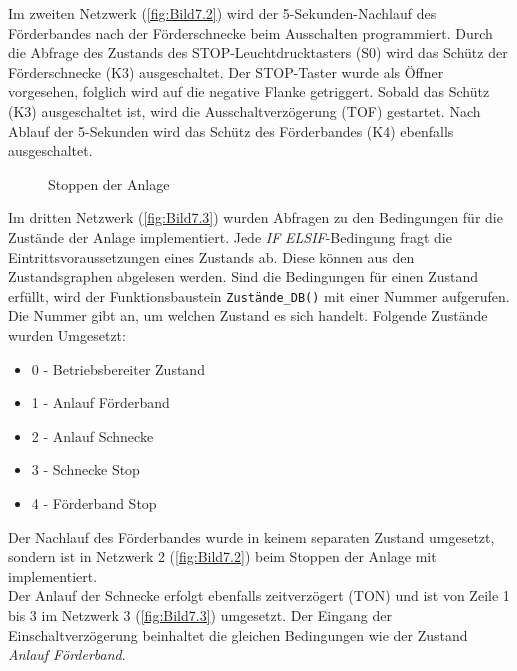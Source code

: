Im zweiten Netzwerk (\autoref{fig:Bild7.2}) wird der 5-Sekunden-Nachlauf des Förderbandes nach der Förderschnecke beim Ausschalten programmiert. Durch die Abfrage des Zustands des STOP-Leuchtdrucktasters (S0) wird das Schütz der Förderschnecke (K3) ausgeschaltet. Der STOP-Taster wurde als Öffner vorgesehen, folglich wird auf die negative Flanke getriggert. Sobald das Schütz (K3) ausgeschaltet ist, wird die Ausschaltverzögerung (TOF) gestartet. Nach Ablauf der 5-Sekunden wird das Schütz des Förderbandes (K4) ebenfalls ausgeschaltet.

\begin{figure}[H]
   \centering
   \caption[Stoppen der Anlage]{Stoppen der Anlage}
   \label{fig:Bild7.2}
\end{figure}

Im dritten Netzwerk (\autoref{fig:Bild7.3}) wurden Abfragen zu den Bedingungen für die Zustände der Anlage implementiert. Jede \textit{IF} \bzw \textit{ELSIF}-Bedingung fragt die Eintrittsvoraussetzungen eines Zustands ab. Diese können aus den Zustandsgraphen abgelesen werden. Sind die Bedingungen für einen Zustand erfüllt, wird der Funktionsbaustein \texttt{Zustände_DB()} mit einer Nummer aufgerufen. Die Nummer gibt an, um welchen Zustand es sich handelt. Folgende Zustände wurden Umgesetzt:

\begin{itemize}
    \item 0 - Betriebsbereiter Zustand
    \item 1 - Anlauf Förderband
    \item 2 - Anlauf Schnecke
    \item 3 - Schnecke Stop
    \item 4 - Förderband Stop
\end{itemize}

Der Nachlauf des Förderbandes wurde in keinem separaten Zustand umgesetzt, sondern ist in Netzwerk 2 (\autoref{fig:Bild7.2}) beim Stoppen der Anlage mit implementiert. \\
Der Anlauf der Schnecke erfolgt ebenfalls zeitverzögert (TON) und ist von Zeile 1 bis 3 im Netzwerk 3 (\autoref{fig:Bild7.3}) umgesetzt. Der Eingang der Einschaltverzögerung beinhaltet die gleichen Bedingungen wie der Zustand \textit{\glqq Anlauf Förderband\grqq{}}.


